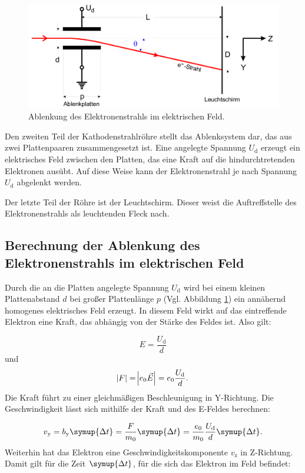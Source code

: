 \begin{figure}[h!]
	\centering
	\includegraphics[width=1\linewidth]{AblenkungEFeld.png}
	\caption{Ablenkung des Elektronenstrahls im elektrischen Feld.}
	\label{fig:ablenkungefeld}
\end{figure}


Den zweiten Teil der Kathodenstrahlröhre stellt das Ablenksystem dar, das aus zwei Plattenpaaren zusammengesetzt ist. Eine angelegte Spannung $U_{\text{d}}$ erzeugt ein elektrisches Feld zwischen den 
Platten, das eine Kraft auf die hindurchtretenden Elektronen ausübt. Auf diese Weise kann der Elektronenstrahl je nach Spannung $U_{\text{d}}$ abgelenkt werden.

Der letzte Teil der Röhre ist der Leuchtschirm. Dieser weist die Auftreffstelle des Elektronenstrahls als leuchtenden Fleck nach.

\subsection{Berechnung der Ablenkung des Elektronenstrahls im elektrischen Feld}
Durch die an die Platten angelegte Spannung $U_{\text{d}}$ wird bei einem kleinen Plattenabstand $d$ bei großer Plattenlänge $p$  (Vgl. Abbildung \ref{fig:ablenkungefeld})
ein annähernd homogenes elektrisches Feld erzeugt. In diesem Feld wirkt auf das eintreffende Elektron eine Kraft, das abhängig von der Stärke des Feldes ist. Also gilt:

\begin{equation}
E = \frac{U_{\text{d}}}{d}
\end{equation}
und
\begin{equation}
\abs{F} = \abs{e_0 \vec{E}} = e_0 \frac{U_{\text{d}}}{d}.
\end{equation}
Die Kraft führt zu einer gleichmäßigen Beschleunigung in Y-Richtung. Die Geschwindigkeit lässt sich mithilfe der Kraft und des E-Feldes berechnen:

\begin{equation}
v_{\text{y}} = b_{\text{y}} \symup{\Delta{t}} = \frac{F}{m_0} \symup{\Delta{t}} = \frac{e_0}{m_0} \frac{U_{\text{d}}}{d} \symup{\Delta{t}}.
\label{eqn:vy}
\end{equation}
Weiterhin hat das Elektron eine Geschwindigkeitskomponente $v_{\text{z}}$ in Z-Richtung. Damit gilt für die Zeit $\symup{\Delta{t}}$, für die sich das Elektron im Feld befindet:

